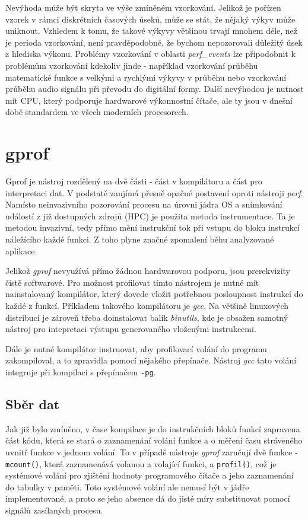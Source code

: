 \documentclass[czech,BP]{thesiskiv}
\begin{document}
Nevýhoda může být skryta ve výše zmíněném vzorkování. Jelikož je pořízen vzorek v rámci diskrétních časových úseků, může se stát, že nějaký výkyv může uniknout. Vzhledem k tomu, že takové výkyvy většinou trvají mnohem déle, než je perioda vzorkování, není pravděpodobné, že bychom nepozorovali důležitý úsek z hlediska výkonu. Problémy vzorkování v oblasti \emph{perf\_events} lze připodobnit k problémům vzorkování kdekoliv jinde - například vzorkování průběhu matematické funkce s velkými a rychlými výkyvy v průběhu nebo vzorkování průběhu audio signálu při převodu do digitální formy. Další nevýhodou je nutnost mít CPU, který podporuje hardwarové výkonnostní čítače, ale ty jsou v dnešní době standardem ve všech moderních procesorech.




\section{gprof}\label{subsec:gprof}

Gprof je nástroj rozdělený na dvě části - část v kompilátoru a část pro interpretaci dat. V podstatě zaujímá přesně opačné postavení oproti nástroji \emph{perf}. Namísto neinvazivního pozorování procesu na úrovni jádra OS a snímkování událostí z již dostupných zdrojů (HPC) je použita metoda instrumentace. Ta je metodou invazivní, tedy přímo mění instrukční tok při vstupu do bloku instrukcí náležícího každé funkci. Z toho plyne značné zpomalení běhu analyzované aplikace.

Jelikož \emph{gprof} nevyužívá přímo žádnou hardwarovou podporu, jsou prerekvizity čistě softwarové. Pro možnost profilovat tímto nástrojem je nutné mít nainstalovaný kompilátor, který dovede vložit potřebnou posloupnost instrukcí do každé z funkcí. Příkladem takového kompilátoru je \emph{gcc}. Na většině linuxových distribucí je zároveň třeba doinstalovat balík \emph{binutils}, kde je obsažen samotný nástroj pro intepretaci výstupu generovaného vloženými instrukcemi.

Dále je nutné kompilátor instruovat, aby profilovací volání do programu zakompiloval, a to zpravidla pomocí nějakého přepínače. Nástroj \emph{gcc} tato volání integruje při kompilaci s přepínačem \texttt{-pg}.

\subsection*{Sběr dat}\label{subsec:gprofgather}

Jak již bylo zmíněno, v čase kompilace je do instrukčních bloků funkcí zapravena část kódu, která se stará o zaznamenání volání funkce a o měření času stráveného uvnitř funkce v jednom volání. To v případě nástroje \emph{gprof} zaručují dvě funkce - \texttt{mcount()}, která zaznamenává volanou a volající funkci, a \texttt{profil()}, což je systémové volání pro zjištění hodnoty programového čítače a jeho zaznamenání do tabulky v paměti\cite{gprof2}. Toto systémové volání ale nemusí být v jádře implementované, a proto se jeho absence dá do jisté míry substituovat pomocí signálů zasílaných procesu.
\end{document}
